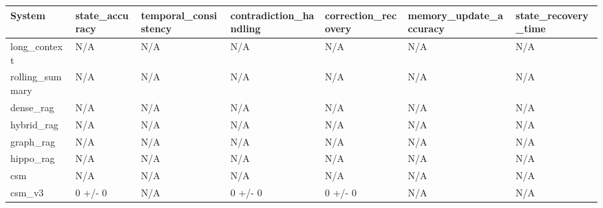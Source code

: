 \begin{tabular}{lllllll}
System & state_accuracy & temporal_consistency & contradiction_handling & correction_recovery & memory_update_accuracy & state_recovery_time \\
\hline
long\_context & N/A & N/A & N/A & N/A & N/A & N/A \\
rolling\_summary & N/A & N/A & N/A & N/A & N/A & N/A \\
dense\_rag & N/A & N/A & N/A & N/A & N/A & N/A \\
hybrid\_rag & N/A & N/A & N/A & N/A & N/A & N/A \\
graph\_rag & N/A & N/A & N/A & N/A & N/A & N/A \\
hippo\_rag & N/A & N/A & N/A & N/A & N/A & N/A \\
csm & N/A & N/A & N/A & N/A & N/A & N/A \\
csm\_v3 & 0 +/- 0 & N/A & 0 +/- 0 & 0 +/- 0 & N/A & N/A \\
\end{tabular}
